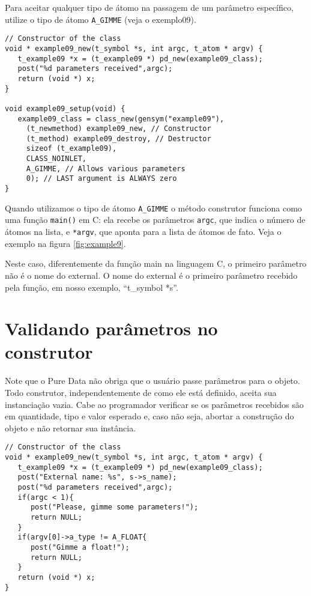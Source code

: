 Para aceitar qualquer tipo de átomo na passagem de um parâmetro específico,
utilize o tipo de átomo \texttt{A\_GIMME} (veja o exemplo09).

\begin{lstlisting}[caption=Objeto que recebe qualquer tipo de parâmetro]
// Constructor of the class
void * example09_new(t_symbol *s, int argc, t_atom * argv) {
   t_example09 *x = (t_example09 *) pd_new(example09_class);
   post("%d parameters received",argc);
   return (void *) x;
}

void example09_setup(void) {
   example09_class = class_new(gensym("example09"),
     (t_newmethod) example09_new, // Constructor
     (t_method) example09_destroy, // Destructor
     sizeof (t_example09),
     CLASS_NOINLET,
     A_GIMME, // Allows various parameters
     0); // LAST argument is ALWAYS zero
}
\end{lstlisting}

Quando utilizamos o tipo de átomo \texttt{A\_GIMME} o método construtor
funciona como uma função \texttt{main()} em C: ela recebe os parâmetros
\texttt{argc}, que indica o número de átomos na lista, e \texttt{*argv}, que
aponta para a lista de átomos de fato. Veja o exemplo na figura
\ref{fig:example9}.


Neste caso, diferentemente da função main na linguagem C, o primeiro parâmetro
não é o nome do external.
O nome do external é o primeiro parâmetro recebido pela função, em nosso exemplo,
``t\_symbol *s''.

\section{Validando parâmetros no construtor}

Note que o Pure Data não obriga que o usuário passe parâmetros para o objeto.
Todo construtor, independentemente de como ele está definido, aceita
sua instanciação vazia.
Cabe ao programador verificar se os parâmetros recebidos são em quantidade,
tipo e valor esperado e, caso não seja, abortar a construção do objeto e não
retornar sua instância.

\begin{lstlisting}[caption=Validando parâmetros na construção de um objeto]
// Constructor of the class
void * example09_new(t_symbol *s, int argc, t_atom * argv) {
   t_example09 *x = (t_example09 *) pd_new(example09_class);
   post("External name: %s", s->s_name);
   post("%d parameters received",argc);
   if(argc < 1){
      post("Please, gimme some parameters!");
      return NULL;
   }
   if(argv[0]->a_type != A_FLOAT{
      post("Gimme a float!");
      return NULL;
   }
   return (void *) x;
}
\end{lstlisting}

